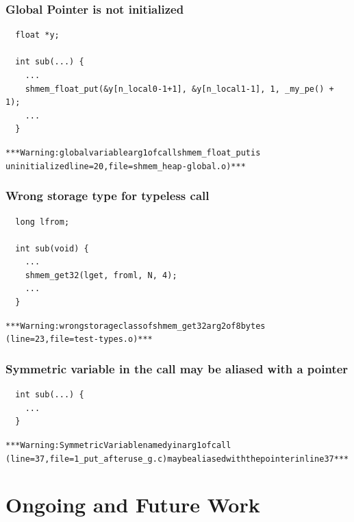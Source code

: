 \subsubsection{Global Pointer is not initialized}

\begin{lstlisting}
  float *y;

  int sub(...) {
    ...
    shmem_float_put(&y[n_local0-1+1], &y[n_local1-1], 1, _my_pe() + 1);
    ...
  }
\end{lstlisting}
\begin{alltt}
  *** \openshmem Warning: global variable arg1 of call shmem_float_put is 
  uninitialized line=20, file=shmem_heap-global.o) ***
\end{alltt}

\subsubsection{Wrong storage type for typeless \openshmem call}

\begin{lstlisting}
  long lfrom;

  int sub(void) {
    ...
    shmem_get32(lget, froml, N, 4);
    ...
  }
\end{lstlisting}
\begin{alltt}
  *** \openshmem Warning: wrong storage class of shmem_get32 arg2 of 8 bytes 
  (line=23, file=test-types.o) ***
\end{alltt}

\subsubsection{Symmetric variable in the \openshmem call may be aliased with a pointer}

\begin{lstlisting}
  int sub(...) {
    ...
  }
\end{lstlisting}
\begin{alltt}
  *** \openshmem Warning: Symmetric Variable named y in arg1 of \openshmem call 
  (line=37, file=1_put_afteruse_g.c) may be aliased with the pointer in line 37***
\end{alltt}

\section{Ongoing and Future Work}
\label{chapter:future}

